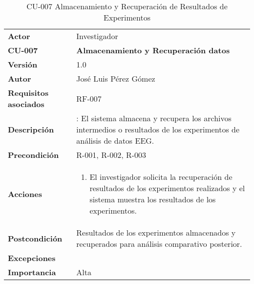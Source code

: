 \begin{table}[p]
	\centering
	\begin{tabularx}{\linewidth}{ p{} p{} }
		\toprule
		\textbf{Actor}              & Investigador    \\
		\textbf{CU-007}    & \textbf{Almacenamiento y Recuperación datos}\\
		\toprule
		\textbf{Versión}              & 1.0    \\
		\textbf{Autor}                & José Luis Pérez Gómez \\
		\textbf{Requisitos asociados} & RF-007 \\
		\textbf{Descripción}          & : El sistema almacena y recupera los archivos intermedios o resultados de los experimentos de análisis de datos EEG.\\
		\textbf{Precondición}         & R-001, R-002, R-003\\
		\textbf{Acciones}             &
		\begin{enumerate}
			\def\labelenumi{\arabic{enumi}.}
			\tightlist
			\item El investigador solicita la recuperación de resultados de los experimentos realizados y el sistema muestra los resultados de los experimentos.
			
		\end{enumerate}\\
		\textbf{Postcondición}        & Resultados de los experimentos almacenados y recuperados para análisis comparativo posterior.\\
		\textbf{Excepciones}          &  \\
		\textbf{Importancia}          & Alta \\
		\bottomrule
	\end{tabularx}
	\caption{CU-007 Almacenamiento y Recuperación de Resultados de Experimentos}
\end{table}


